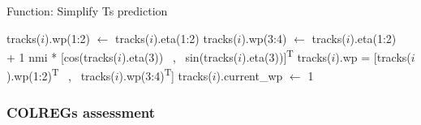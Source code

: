 
\begin{algorithm}[h]
    \caption{Function: Simplify \gls{Ts} prediction} \label{ALG: Simplify Tracks}
    \begin{algorithmic}
                \State tracks($i$).wp(1:2) $\gets$ tracks($i$).eta(1:2)
                \State tracks($i$).wp(3:4) $\gets$ tracks($i$).eta(1:2) \\ \hfill + 1 nmi * [cos(tracks($i$).eta(3)) \ , \ sin(tracks($i$).eta(3))]\textsuperscript{T}
                \State tracks($i$).wp = [tracks($i$).wp(1:2)\textsuperscript{T} \ , \ tracks($i$).wp(3:4)\textsuperscript{T}]
                \State tracks($i$).current\_wp $\gets$ 1
            \EndIf
        \EndFor
    \end{algorithmic}
\end{algorithm}



\subsubsection*{COLREGs assessment}

